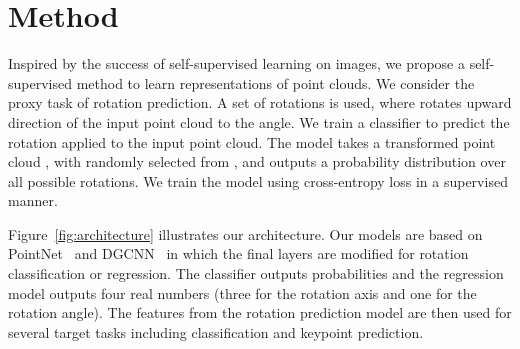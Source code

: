 \documentclass[10pt,twocolumn,letterpaper]{article}
\begin{document}
\section{Method}
\label{sec:method}
Inspired by the success of self-supervised learning on images, we propose a self-supervised method to learn representations of point clouds. We consider the proxy task of rotation prediction. 
A set of  rotations  is used, where  rotates upward direction of the input point cloud  to the  angle. We train a classifier  to predict the rotation applied to the input point cloud. 
The model takes a transformed point cloud , with  randomly selected from , and outputs a probability distribution over all possible rotations. We train the model using cross-entropy loss in a supervised manner.


Figure~\ref{fig:architecture} illustrates our architecture. Our models are based on PointNet~\cite{qi2017pointnet} and DGCNN~\cite{wang2019dynamic} in which the final layers are modified for rotation classification or regression. 
The classifier outputs  probabilities and the regression model outputs four real numbers (three for the rotation axis and one for the rotation angle). 
The features from the rotation prediction model are then used for several target tasks including classification and keypoint prediction. 
\end{document}
